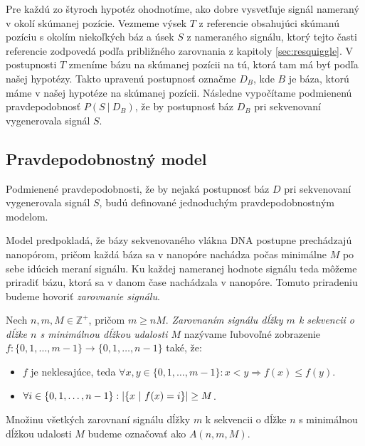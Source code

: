 
Pre každú zo štyroch hypotéz ohodnotíme, ako dobre vysvetľuje signál nameraný v okolí skúmanej
pozície. Vezmeme výsek $T$ z referencie obsahujúci skúmanú pozíciu s okolím niekoľkých báz a úsek $S$
z nameraného signálu, ktorý tejto časti referencie zodpovedá podľa približného zarovnania 
z kapitoly \ref{sec:resquiggle}. V postupnosti $T$ zmeníme bázu na skúmanej pozícii na tú, ktorá 
tam má byť podľa našej hypotézy. Takto upravenú postupnosť označme $D_B$, kde $B$ je báza, ktorú
máme v našej hypotéze na skúmanej pozícii. 
Následne vypočítame podmienenú pravdepodobnosť $P(S ~|~ D_B)$, že by postupnosť báz $D_B$ pri sekvenovaní vygenerovala signál $S$.

\subsection{Pravdepodobnostný model}

Podmienené pravdepodobnosti, že by nejaká postupnosť báz $D$ pri sekvenovaní vygenerovala signál $S$,
budú definované jednoduchým pravdepodobnostným modelom.

Model predpokladá, že bázy sekvenovaného vlákna DNA postupne prechádzajú nanopórom, pričom
každá báza sa v nanopóre nachádza počas minimálne $M$ po sebe idúcich meraní signálu. Ku každej
nameranej hodnote signálu teda môžeme priradiť bázu, ktorá sa v danom čase nachádzala v nanopóre.
Tomuto priradeniu budeme hovoriť \emph{zarovnanie signálu}.

\begin{definicia}

Nech $n, m, M \in \mathbb{Z}^+$, pričom $m \geq n M$. \emph{Zarovnaním signálu dĺžky $m$ k sekvencii
o dĺžke $n$ s
 minimálnou dĺžkou udalosti $M$} nazývame ľubovoľné zobrazenie $f: \{0, 1, \dots, m-1\} \rightarrow \{0, 1, \dots, n-1\}$
také, že:

\begin{itemize}
\item $f$ je neklesajúce, teda $\forall x, y \in \{0, 1, \dots, m-1\}: x < y \Rightarrow f(x) \leq f(y)$.
\item $\forall i \in \{0, 1, \dots, n-1\}: \abs*{\{x ~|~ f(x) = i\}} \geq M$.
\end{itemize}

Množinu všetkých zarovnaní signálu dĺžky $m$ k sekvencii o dĺžke $n$ s minimálnou dĺžkou udalosti $M$ budeme označovať ako
$A(n, m, M)$.

\end{definicia}

